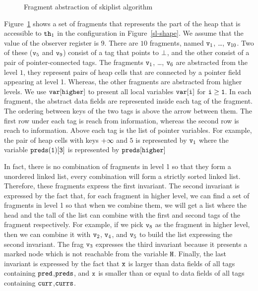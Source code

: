 \begin{figure}
\center
	
\caption{Fragment abstraction of skiplist algorithm}
\label{fig:skiplistabs}
\end{figure} 
Figure~\ref{fig:skiplistabs} shows a set of fragments that represents the
part of the heap that is accessible to
${\tt th}_1$ in the configuration in Figure~\ref{sl-shape}. We assume that
the value of the observer register is $9$. 
There are $10$ fragments, named $\mathtt{v}_1$, \ldots , $\mathtt{v}_{10}$. Two of
these ($\mathtt{v}_5$ and $\mathtt{v}_9$) consist of a tag that points to $\bot$,
and the other consist of a pair of pointer-connected tags. The fragments $\mathtt{v}_1$, \ldots , $\mathtt{v}_{6}$ are abstracted from the level $1$, they represent pairs of heap cells that are connected by a pointer field appearing at level 1. Whereas, the other fragments are abstracted from higher levels. We use $\tt var[higher]$ to present all local variables $\tt var[i]$ for $\tt i \geq 1$.  In each fragment, the abstract data fields are represented inside each tag of the fragment. The ordering between keys of the two tags is above the arrow between them. The first row under each tag is reach from information, whereas the second row is reach to information. Above each tag is the list of pointer variables. For example, the pair of heap cells with keys $\tt +\infty$ and $5$ is represented by $\mathtt{v}_1$ where the variable $\tt preds(1)[3]$ is represented by $\tt preds[higher]$

In fact, there is no combination of fragments in level 1 so that they form a unordered linked list, every combination will form a strictly sorted linked list. Therefore, these fragments express the first invariant. The second invariant is expressed by the fact that, for each fragment in higher level, we can find a set of fragments in level 1 so that when we combine them, we will get a list where the head and the tall of the list can combine with the first and second tags of the fragment respectively. For example, if we pick $\mathtt{v}_{8}$ as the fragment in higher level, then we can combine it with $\mathtt{v}_{2}$, $\mathtt{v}_{4}$, and $\mathtt{v}_{5}$ to build the list expressing the second invariant. The frag $\mathtt{v}_{3}$ expresses the third invariant because it presents a marked node which is not reachable from the variable $\tt H$. Finally, the last invariant is expressed by the fact that $\tt x$ is larger than data fields of all tags containing $\tt pred$,$\tt preds$, and $\tt x$ is smaller than or equal to data fields of all tags containing $\tt curr$,$\tt currs$.     


